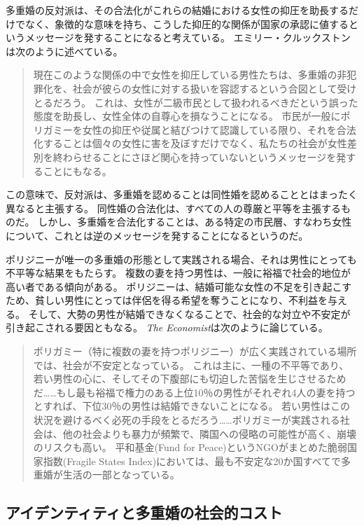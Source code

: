 \documentclass[paper=a4,book,openany]{jlreq}
\begin{document}
多重婚の反対派は、その合法化がこれらの結婚における女性の抑圧を助長するだけでなく、象徴的な意味を持ち、こうした抑圧的な関係が国家の承認に値するというメッセージを発することになると考えている。
エミリー・クルックストンは次のように述べている。

\begin{quote}
現在このような関係の中で女性を抑圧している男性たちは、多重婚の非犯罪化を、社会が彼らの女性に対する扱いを容認するという合図として受けとるだろう。
これは、女性が二級市民として扱われるべきだという誤った態度を助長し、女性全体の自尊心を損なうことになる。
市民が一般にポリガミーを女性の抑圧や従属と結びつけて認識している限り、それを合法化することは個々の女性に害を及ぼすだけでなく、私たちの社会が女性差別を終わらせることにさほど関心を持っていないというメッセージを発することにもなる。
\citep[p.272]{crookston15:_love_polyg_marriag}
\end{quote}

この意味で、反対派は、多重婚を認めることは同性婚を認めることとはまったく異なると主張する。
同性婚の合法化は、すべての人の尊厳と平等を主張するものだ。
しかし、多重婚を合法化することは、ある特定の市民層、すなわち女性について、これとは逆のメッセージを発することになるというのだ。

ポリジニーが唯一の多重婚の形態として実践される場合、それは男性にとっても不平等な結果をもたらす。
複数の妻を持つ男性は、一般に裕福で社会的地位が高い者である傾向がある。
ポリジニーは、結婚可能な女性の不足を引き起こすため、貧しい男性にとっては伴侶を得る希望を奪うことになり、不利益を与える。
そして、大勢の男性が結婚できなくなることで、社会的な対立や不安定が引き起こされる要因ともなる。
\emph{The Economist}は次のように論じている。

\begin{quote}
ポリガミー（特に複数の妻を持つポリジニー）が広く実践されている場所では、社会が不安定となっている。
これは主に、一種の不平等であり、若い男性の心に、そしてその下腹部にも切迫した苦悩を生じさせるためだ……もし最も裕福で権力のある上位10％の男性がそれぞれ4人の妻を持つとすれば、下位30％の男性は結婚できないことになる。
若い男性はこの状況を避けるべく必死の手段をとるだろう……ポリガミーが実践される社会は、他の社会よりも暴力が頻繁で、隣国への侵略の可能性が高く、崩壊のリスクも高い。
平和基金(Fund for Peace)というNGOがまとめた脆弱国家指数(Fragile States Index)においては、最も不安定な20か国すべてで多重婚が生活の一部となっている。
\citep{economist17:_link_between_polyg_war}
\end{quote}

\subsection{アイデンティティと多重婚の社会的コスト}
\end{document}
